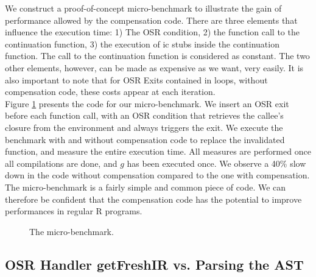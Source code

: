 We construct a proof-of-concept micro-benchmark to illustrate the gain of performance allowed by the compensation code. 
There are three elements that influence the execution time: 1) The OSR condition, 2) the function call to the continuation function, 3) the execution of ic stubs inside the continuation function.
The call to the continuation function is considered as constant.
The two other elements, however, can be made as expensive as we want, very easily.
It is also important to note that for OSR Exits contained in loops, without compensation code, these costs appear at each iteration.\\

Figure \ref{fig:microbenchmark} presents the code for our micro-benchmark. 
We insert an OSR exit before each function call, with an OSR condition that retrieves the callee's closure from the environment and always triggers the exit.
We execute the benchmark with and without compensation code to replace the invalidated function, and measure the entire execution time.
All measures are performed once all compilations are done, and $g$ has been executed once.
We observe a 40\% slow down in the code without compensation compared to the one with compensation.
The micro-benchmark is a fairly simple and common piece of code.
We can therefore be confident that the compensation code has the potential to improve performances in regular R programs.\\

\begin{figure}[h]
\caption{The micro-benchmark.}
\label{fig:microbenchmark}
\end{figure}


\subsection{OSR Handler getFreshIR vs. Parsing the AST}\label{section:getfreshtest}



